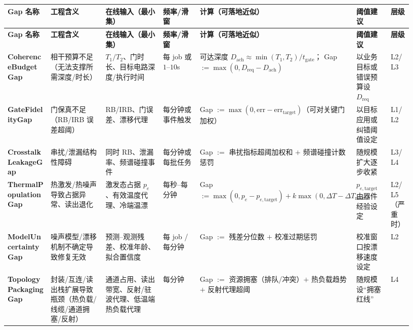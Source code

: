 \documentclass[12pt]{article}
\begin{document}
\begin{CJK*}{UTF8}{gkai}
\begingroup
\scriptsize
\setlength{\tabcolsep}{2pt}
\renewcommand{\arraystretch}{1.2}
\setlength{\LTleft}{0pt}
\setlength{\LTright}{0pt}
\begin{longtable}{|
  >{\raggedright\arraybackslash}p{0.13\linewidth}|
  >{\raggedright\arraybackslash}p{0.17\linewidth}|
  >{\raggedright\arraybackslash}p{0.17\linewidth}|
  >{\raggedright\arraybackslash}p{0.11\linewidth}|
  >{\raggedright\arraybackslash}p{0.20\linewidth}|
  >{\raggedright\arraybackslash}p{0.09\linewidth}|
  >{\raggedright\arraybackslash}p{0.06\linewidth}|}
\hline
\textbf{Gap 名称} & \textbf{工程含义} & \textbf{在线输入（最小集）} & \textbf{频率/滑窗} & \textbf{计算（可落地近似）} & \textbf{阈值建议} & \textbf{层级}
  \\
\hline
\endfirsthead
\hline
\textbf{Gap 名称} & \textbf{工程含义} & \textbf{在线输入（最小集）} & \textbf{频率/滑窗} & \textbf{计算（可落地近似）} & \textbf{阈值建议} & \textbf{层级}
  \\
\hline
\endhead
\textbf{Coherence\allowbreak Budget\allowbreak Gap}
& 相干预算不足（无法支撑所需深度/时长）
& $T_1/T_2$、门时长、目标电路深度/执行时间
& 每 job 或 $1$--$10$s
& 可达深度 $D_{\mathrm{ach}}\approx \min(T_1,T_2)/t_{\mathrm{gate}}$；
\newline Gap $:=\max(0,D_{\mathrm{req}}-D_{\mathrm{ach}})$
& 以业务目标或错误预算设 $D_{\mathrm{req}}$
& L2/L3
\\ \hline
\textbf{Gate\allowbreak Fidelity\allowbreak Gap}
& 门保真不足（RB/IRB 误差超阈）
& RB/IRB、门误差、漂移代理
& 每分钟或事件触发
& Gap $:=\max(0,\mathrm{err}-\mathrm{err}_{\mathrm{target}})$（可对关键门加权）
& 以目标应用或纠错阈值设定
& L1/L2
\\ \hline
\textbf{Crosstalk\allowbreak Leakage\allowbreak Gap}
& 串扰/泄漏结构性障碍
& 同时 RB、泄漏率、频谱碰撞事件
& 每分钟或每批任务
& Gap $:=$ 串扰指标超阈加权和 $+$ 频谱碰撞计数惩罚
& 随规模扩大逐步收紧
& L3/L4
\\ \hline
\textbf{Thermal\allowbreak Population\allowbreak Gap}
& 热激发/热噪声导致占据异常、读出退化
& 激发态占据 $p_e$、有效温度代理、冷端温漂
& 每秒--每分钟
& Gap $:=\max(0,p_e-p_{e,\mathrm{target}})+k\max(0,\Delta T-\Delta T_{\max})$
& $p_{e,\mathrm{target}}$ 由器件经验设定
& L2/\allowbreak L5（严重时）
\\ \hline
\textbf{Model\allowbreak Uncertainty\allowbreak Gap}
& 噪声模型/漂移机制不确定导致修复无效
& 预测--观测残差、校准年龄、拟合置信度
& 每 job / 每分钟
& Gap $:=$ 残差分位数 $+$ 校准过期惩罚
& 校准窗口按漂移速度设定
& L2
\\ \hline
\textbf{Topology\allowbreak Packaging\allowbreak Gap}
& 封装/互连/读出栈扩展导致瓶颈（热负载/线缆/通道拥塞/反射）
& 通道占用、读出带宽、反射/驻波代理、低温端热负载代理
& 每分钟
& Gap $:=$ 资源拥塞（排队/冲突）$+$ 热负载趋势 $+$ 反射代理超阈
& 随规模设“拥塞红线”
& L4
\\ \hline
\end{longtable}
\endgroup


\end{CJK*}
\end{document}
